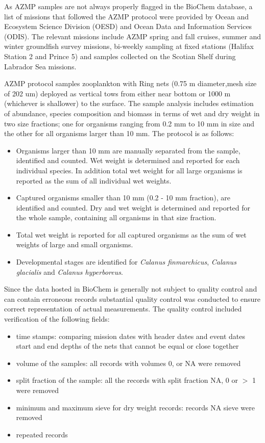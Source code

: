 \documentclass[letterpaper,portrait,11pt]{scrartcl}
\numberwithin{equation}{section}		%
\numberwithin{figure}{section}		%
\numberwithin{table}{section}				%
\begin{document}
\begin{appendices}
As AZMP samples are not always properly flagged in the BioChem database, a list of missions that followed the AZMP protocol were provided by Ocean and Ecosystem Science Division (OESD) and Ocean Data and Information Services (ODIS). The relevant missions include AZMP spring and fall cruises, summer and winter groundfish survey missions, bi-weekly sampling at fixed stations (Halifax Station 2 and Prince 5) and samples collected on the Scotian Shelf during Labrador Sea missions. 

AZMP protocol samples zooplankton with Ring nets (0.75 m diameter,mesh size of 202 um) deployed as vertical tows from either near bottom or 1000 m (whichever is shallower) to the surface. The sample analysis includes estimation of abundance, species composition and biomass in terms of wet and dry weight in two size fractions; one for organisms ranging from 0.2 mm to 10 mm in size and the other for all organisms larger than 10 mm.  The protocol is as follows:

\begin{itemize}
  \item Organisms larger than 10 mm are manually separated from the sample, identified and counted. Wet weight is determined and reported for each individual species. In addition total wet weight for all large organisms is reported as the sum of all individual wet weights.
  \item Captured organisms smaller than 10 mm (0.2 - 10 mm fraction), are identified and counted. Dry and wet weight is determined and reported for the whole sample, containing all organisms in that size fraction.
  \item Total wet weight is reported for all captured organisms as the sum of wet weights of large and small organisms.
  \item Developmental stages are identified for \textit{Calanus finmarchicus}, \textit{Calanus glacialis} and \textit{Calanus hyperboreus}. 
\end{itemize}


Since the data hosted in BioChem is generally not subject to quality control and can contain erroneous records substantial quality control was conducted to ensure correct representation of actual measurements. The quality control included verification of the following fields: 

\begin{itemize}
  \item time stamps: comparing mission dates with header dates and event dates 
  start and end depths of the nets that cannot be equal or close together
  \item volume of the samples: all records with volumes 0, or NA were removed
  \item split fraction of the sample: all the records with split fraction NA, 0 or $>$ 1 were removed 
  \item minimum and maximum sieve for dry weight records: records NA sieve were removed
  \item repeated records 
\end{itemize}



\end{appendices}
\end{document}
